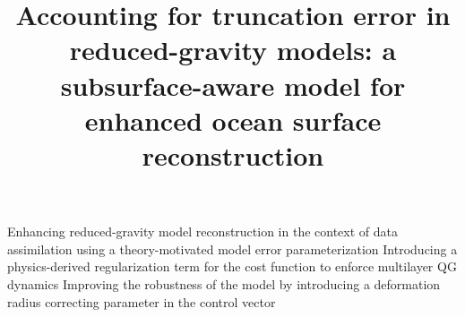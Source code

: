 \documentclass[
  draft
]{agujournal2025}
\begin{document}

\title{Accounting for truncation error in reduced-gravity models: a subsurface-aware model for enhanced ocean surface reconstruction}


	      








%
\keypoints%
    {Enhancing reduced-gravity model reconstruction in the context of data assimilation using a theory-motivated model error parameterization}
    {Introducing a physics-derived regularization term for the cost function to enforce multilayer QG dynamics}
    {Improving the robustness of the model by introducing a deformation radius correcting parameter in the control vector}




\maketitle
\end{document}
